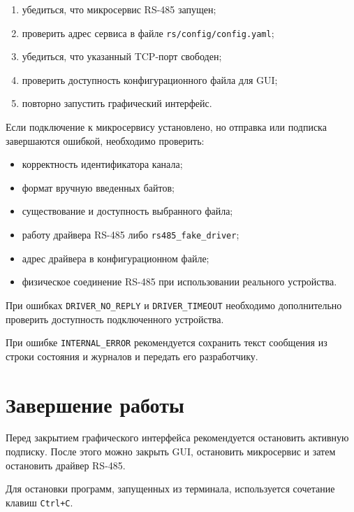 \begin{enumerate}
	\item убедиться, что микросервис RS-485 запущен;
	\item проверить адрес сервиса в файле \texttt{rs/config/config.yaml};
	\item убедиться, что указанный TCP-порт свободен;
	\item проверить доступность конфигурационного файла для GUI;
	\item повторно запустить графический интерфейс.
\end{enumerate}

Если подключение к микросервису установлено, но отправка или подписка
завершаются ошибкой, необходимо проверить:

\begin{itemize}
	\item корректность идентификатора канала;
	\item формат вручную введенных байтов;
	\item существование и доступность выбранного файла;
	\item работу драйвера RS-485 либо \texttt{rs485\_fake\_driver};
	\item адрес драйвера в конфигурационном файле;
	\item физическое соединение RS-485 при использовании реального устройства.
\end{itemize}

При ошибках \texttt{DRIVER\_NO\_REPLY} и \texttt{DRIVER\_TIMEOUT} необходимо
дополнительно проверить доступность подключенного устройства.

При ошибке \texttt{INTERNAL\_ERROR} рекомендуется сохранить текст сообщения
из строки состояния и журналов и передать его разработчику.

\section{Завершение работы}

Перед закрытием графического интерфейса рекомендуется остановить активную
подписку. После этого можно закрыть GUI, остановить микросервис и затем
остановить драйвер RS-485.

Для остановки программ, запущенных из терминала, используется сочетание клавиш
\texttt{Ctrl+C}.